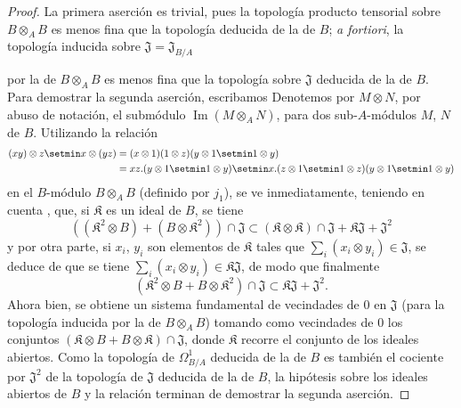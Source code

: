 \begin{proof}
La primera aserción es trivial, pues la topología producto tensorial sobre
$B\otimes_A B$ es menos fina que la topología deducida de la de $B$;
\emph{a fortiori}, la topología inducida sobre
$\mathfrak{J}=\mathfrak{J}_{B/A}$

por la de $B\otimes_A B$ es menos fina que la topología sobre $\mathfrak{J}$
deducida de la de $B$. Para demostrar la segunda aserción, escribamos
Denotemos por $M\otimes N$, por abuso de notación, el submódulo
$\operatorname{Im}(M\otimes_A N)$, para dos sub-$A$-módulos $M$, $N$ de $B$.
Utilizando la relación
\[
\begin{aligned}
  (xy)\otimes z\setmin x\otimes(yz)
  &=(x\otimes1)(1\otimes z)(y\otimes1\setmin 1\otimes y)\\
  &=xz.(y\otimes1\setmin 1\otimes y)
    \setmin x.(z\otimes1\setmin 1\otimes z)(y\otimes1\setmin 1\otimes y)
\end{aligned}
\]
en el $B$-módulo $B\otimes_A B$ (definido por $j_1$), se ve inmediatamente,
teniendo en cuenta , que, si $\mathfrak{K}$ es un ideal de
$B$, se tiene
\[
  ((\mathfrak{K}^2\otimes B)+(B\otimes\mathfrak{K}^2))\cap\mathfrak{J}
  \subset(\mathfrak{K}\otimes\mathfrak{K})\cap\mathfrak{J}
  +\mathfrak{K}\mathfrak{J}+\mathfrak{J}^2
\]
y por otra parte, si $x_i$, $y_i$ son elementos de $\mathfrak{K}$ tales
que $\sum_i(x_i\otimes y_i)\in\mathfrak{J}$, se deduce de
 que se tiene
$\sum_i(x_i\otimes y_i)\in\mathfrak{K}\mathfrak{J}$, de modo que finalmente
\begin{equation}
\tag{20.4.5.1}
\label{0.20.4.5.1-fr}
  (\mathfrak{K}^2\otimes B+B\otimes\mathfrak{K}^2)\cap\mathfrak{J}
  \subset\mathfrak{K}\mathfrak{J}+\mathfrak{J}^2.
\end{equation}
Ahora bien, se obtiene un sistema fundamental de vecindades de $0$ en $\mathfrak{J}$
(para la topología inducida por la de $B\otimes_A B$) tomando como
vecindades de $0$ los conjuntos
$(\mathfrak{K}\otimes B+B\otimes\mathfrak{K})\cap\mathfrak{J}$, donde
$\mathfrak{K}$ recorre el conjunto de los ideales abiertos. Como la topología de
$\Omega^1_{B/A}$ deducida de la de $B$ es también el cociente por
$\mathfrak{J}^2$ de la topología de $\mathfrak{J}$ deducida de la de $B$,
la hipótesis sobre los ideales abiertos de $B$ y la relación
 terminan de demostrar la segunda aserción.
\end{proof}

